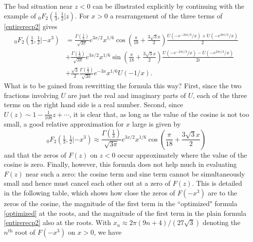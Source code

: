 \documentclass[12pt]{article}
\newcommand{\ee}[0] {e}
\newcommand{\ii}[0] {i}
\numberwithin{equation}{section}
\newcommand{\FFf}[5] {{}_{#1}{#2}_{#3} \left(#4 | {#5} \right)}
\begin{document}
The bad situation near $z<0$ can be illustrated explicitly by continuing with the example of $\FFf{0}{F}{2}{\tfrac{1}{3},\tfrac{1}{2}}{z}$. For $x>0$ a rearrangement of the three terms of \eqref{entirerecp2} gives
\begin{equation}
\label{optimized}
\begin{aligned}
\FFf{0}{F}{2}{\tfrac{1}{3},\tfrac{1}{2}}{-x^3} &= \frac{\Gamma\left(\frac{1}{3}\right)}{\sqrt{3 \pi }} \ee^{3 x/2} x^{1/6} \cos \left(\frac{\pi}{18} + \frac{3 \sqrt{3}
   x}{2}\right)\frac{U(-\ee^{-2 \pi \ii/3}/x)+U(-\ee^{2 \pi \ii/3}/x)}{2}\\
&+\frac{\Gamma\left(\frac{1}{3}\right)}{\sqrt{3 \pi }} \ee^{3 x/2} x^{1/6} \sin \left(\frac{\pi }{18} + \frac{3 \sqrt{3}
   x}{2}\right)
   \frac{U(-\ee^{-2\pi \ii/3}/x)-U(-\ee^{2\pi \ii/3}/x)}{2\ii}\\
 &+\frac{\sqrt{3}}{2} \frac{\Gamma\left(\frac{1}{3}\right)}{\sqrt{3 \pi }} \ee^{-3x} x^{1/6} U(-1/x)
\text{.}
\end{aligned}
\end{equation}
What is to be gained from rewritting the formula this way? First, since the two fractions involving $U$ are just the real and imaginary parts of $U$, each of the three terms on the right hand side is a real number. Second, since $U(z) \sim 1-\frac{1}{108}z + \cdots$, it is clear that, as long as the value of the cosine is not too small, a good relative approximation for $x$ large is given by
\begin{equation*}
\FFf{0}{F}{2}{\tfrac{1}{3},\tfrac{1}{2}}{-x^3} \approx \frac{\Gamma\left(\frac{1}{3}\right)}{\sqrt{3 \pi }} e^{3 x/2} x^{1/6}
   \cos \left(\frac{\pi }{18} + \frac{3 \sqrt{3}
   x}{2}\right)
\end{equation*}
and that the zeros of $F(z)$ on $z<0$ occur approximately where the value of the cosine is zero. Finally, however, this formula does not help much in evaluating $F(z)$ near such a zero: the cosine term and sine term cannot be simultaneously small and hence must cancel each other out at a zero of $F(z)$. This is detailed in the following table, which shows how close the zeros of $F(-x^3)$ are to the zeros of the cosine, the magnitude of the first term in the ``optimized" formula \eqref{optimized} at the roots, and the magnitude of the first term in the plain formula \eqref{entirerecp2} also at the roots. With $x_n \approx 2\pi(9n+4)/(27 \sqrt{3})$ denoting the $n^{\text{th}}$ root of $F(-x^3)$ on $x>0$, we have
\end{document}
